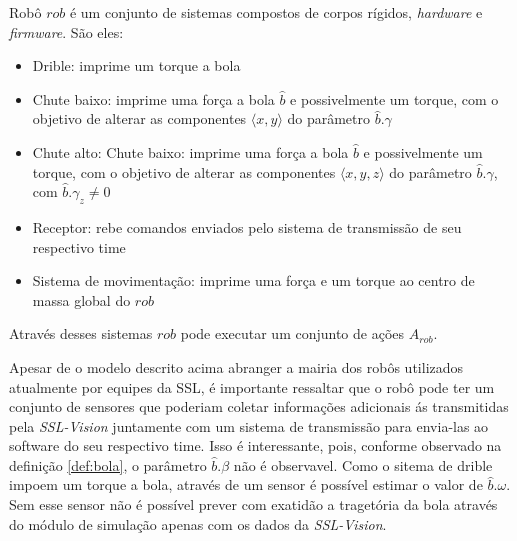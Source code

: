 \begin{defi}[Robô]
  Robô $rob$ é um conjunto de sistemas compostos de corpos rígidos,
  \textit{hardware} e \textit{firmware}. São eles:
  
  \begin{itemize}
    \item Drible: imprime um torque a bola
    \item Chute baixo: imprime uma força a bola $\hat{b}$
          e possivelmente um torque, com o objetivo de
          alterar as componentes $\langle x,y \rangle$
          do parâmetro $\hat{b}.\gamma$ 
    \item Chute alto: Chute baixo: imprime uma força a bola $\hat{b}$
          e possivelmente um torque, com o objetivo de
          alterar as componentes $\langle x,y,z \rangle$
          do parâmetro $\hat{b}.\gamma$, com $\hat{b}.\gamma_z \neq 0$
    \item Receptor: rebe comandos enviados pelo sistema de
          transmissão de seu respectivo time
    \item Sistema de movimentação: imprime uma força e um torque
          ao centro de massa global do $rob$
  \end{itemize}  
  
  Através desses sistemas $rob$ pode executar um conjunto de ações $A_{rob}$.
  
  Apesar de o modelo descrito acima abranger a mairia dos
  robôs utilizados atualmente por equipes da SSL, é importante
  ressaltar que o robô pode ter um conjunto de sensores que
  poderiam coletar informações adicionais ás transmitidas pela
  \textit{SSL-Vision} juntamente com um sistema de transmissão
  para envia-las ao software do seu respectivo time. Isso é
  interessante, pois, conforme observado na definição \ref{def:bola},
  o parâmetro $\hat{b}.\beta$ não é observavel. Como o sitema de
  drible impoem um torque a bola, através de um sensor é possível
  estimar o valor de $\hat{b}.\omega$. Sem esse sensor não é possível
  prever com exatidão a tragetória da bola através do módulo de
  simulação apenas com os dados da \textit{SSL-Vision}.
  
\end{defi}

